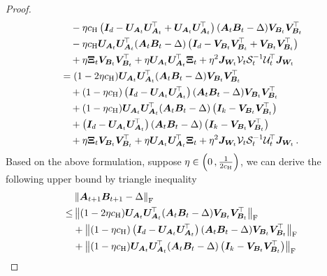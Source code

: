 \begin{proof}
\begin{align*}
    & \quad - \eta c_{\rm H} \left(\bm I_d - \bm U_{\bm A_t} \bm U_{\bm A_t}^{\!\top}+\bm U_{\bm A_t} \bm U_{\bm A_t}^{\!\top}\right)(\bm A_t \bm B_t - \Delta)\bm V_{\bm B_t} \bm V_{\bm B_t}^{\!\top}\\
    & \quad - \eta c_{\rm H} \bm U_{\bm A_t} \bm U_{\bm A_t}^{\!\top}(\bm A_t \bm B_t - \Delta)\left(\bm I_d - \bm V_{\bm B_t} \bm V_{\bm B_t}^{\!\top} + \bm V_{\bm B_t} \bm V_{\bm B_t}^{\!\top}\right)\\
    & \quad + \eta \bm \Xi_t \bm V_{\bm B_t} \bm V_{\bm B_t}^{\!\top} + \eta \bm U_{\bm A_t} \bm U_{\bm A_t}^{\!\top} \bm \Xi_t + \eta^2 \bm J_{\bm W_t} \mathcal{V}_t \mathcal{S}_t^{-1} \mathcal{U}^{\!\top}_t\bm J_{\bm W_t}\\
    & = (1-2 \eta c_{\rm H})\bm U_{\bm A_t} \bm U_{\bm A_t}^{\!\top}(\bm A_t \bm B_t - \Delta)\bm V_{\bm B_t} \bm V_{\bm B_t}^{\!\top}\\
    & \quad + (1-\eta c_{\rm H})\left(\bm I_d - \bm U_{\bm A_t} \bm U_{\bm A_t}^{\!\top}\right)(\bm A_t \bm B_t - \Delta)\bm V_{\bm B_t} \bm V_{\bm B_t}^{\!\top}\\
    & \quad + (1-\eta c_{\rm H})\bm U_{\bm A_t} \bm U_{\bm A_t}^{\!\top}(\bm A_t \bm B_t - \Delta)\left(\bm I_k - \bm V_{\bm B_t} \bm V_{\bm B_t}^{\!\top}\right)\\
    & \quad + \left(\bm I_d - \bm U_{\bm A_t} \bm U_{\bm A_t}^{\!\top}\right)(\bm A_t \bm B_t - \Delta)\left(\bm I_k - \bm V_{\bm B_t} \bm V_{\bm B_t}^{\!\top}\right)\\
    & \quad + \eta \bm \Xi_t \bm V_{\bm B_t} \bm V_{\bm B_t}^{\!\top} + \eta \bm U_{\bm A_t} \bm U_{\bm A_t}^{\!\top} \bm \Xi_t + \eta^2 \bm J_{\bm W_t} \mathcal{V}_t \mathcal{S}_t^{-1} \mathcal{U}^{\!\top}_t\bm J_{\bm W_t}\,.
\end{align*}
Based on the above formulation, suppose $\eta\in\left(0\,,\frac{1}{2c_{\rm H}}\right)$, we can derive the following upper bound by triangle inequality
\begin{align}
    & \left\|\bm A_{t+1}\bm B_{t+1} - \Delta\right\|_{\rm F}\\
    \leq & \left\|(1-2 \eta c_{\rm H})\bm U_{\bm A_t} \bm U_{\bm A_t}^{\!\top}(\bm A_t \bm B_t - \Delta)\bm V_{\bm B_t} \bm V_{\bm B_t}^{\!\top}\right\|_{\rm F}\nonumber\\
    & + \left\|(1-\eta c_{\rm H})\left(\bm I_d - \bm U_{\bm A_t} \bm U_{\bm A_t}^{\!\top}\right)(\bm A_t \bm B_t - \Delta)\bm V_{\bm B_t} \bm V_{\bm B_t}^{\!\top}\right\|_{\rm F}\nonumber\\
    & + \left\|(1-\eta c_{\rm H})\bm U_{\bm A_t} \bm U_{\bm A_t}^{\!\top}(\bm A_t \bm B_t - \Delta)\left(\bm I_k - \bm V_{\bm B_t} \bm V_{\bm B_t}^{\!\top}\right)\right\|_{\rm F}\nonumber\\

\end{align}
\end{proof}
